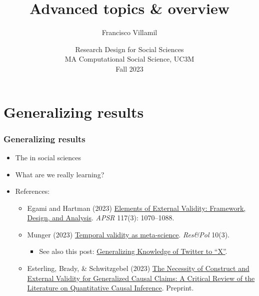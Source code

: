 \documentclass[aspectratio=43]{beamer}
\title[Lecture 5: Advanced topics]{\Large Advanced topics \& overview}
\author[]{Francisco Villamil}
\date[]{Research Design for Social Sciences\\MA Computational Social Science, UC3M\\Fall 2023}
\begin{document}

\begin{frame}
  \titlepage
\end{frame}

\section{Generalizing results}

\begin{frame}
\frametitle{Generalizing results}
\centering

\begin{itemize}
  \item The  in social sciences
  \item What are we really learning?
  \item References:
  \begin{itemize}
    \item Egami and Hartman (2023) \href{https://doi.org/10.1017/S0003055422000880}{Elements of External Validity: Framework, Design, and Analysis}. \textit{APSR} 117(3): 1070--1088.
    \item Munger (2023) \href{https://doi.org/10.1177/20531680231187271}{Temporal validity as meta-science}. \textit{Res\&Pol} 10(3).
    \begin{itemize}
      \item See also this post: \href{https://kevinmunger.substack.com/p/generalizing-knowledge-of-twitter}{Generalizing Knowledge of Twitter to ``X''}.
    \end{itemize}
    \item Esterling, Brady, \& Schwitzgebel (2023) \href{https://osf.io/2s8w5/}{The Necessity of Construct and External Validity for Generalized Causal Claims: A Critical Review of the Literature on Quantitative Causal Inference}. Preprint.
  \end{itemize}
\end{itemize}

\end{frame}
\end{document}
